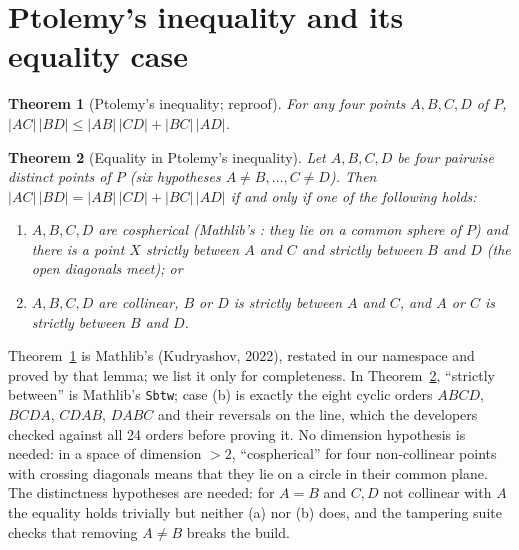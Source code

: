 \documentclass[11pt]{article}
\newtheorem{theorem}{Theorem}
\theoremstyle{definition}
\theoremstyle{remark}
\newcommand{\lean}[1]{\texttt{#1}}
\begin{document}
\section{Ptolemy's inequality and its equality case}\label{sec:ptolemy}
\begin{theorem}[Ptolemy's inequality; reproof]\label{thm:ptolemy}
For any four points $A,B,C,D$ of $P$, $|AC|\,|BD|\le|AB|\,|CD|+|BC|\,|AD|$.
\end{theorem}
\begin{theorem}[Equality in Ptolemy's inequality]\label{thm:ptolemyeq}
Let $A,B,C,D$ be four pairwise distinct points of $P$ (six hypotheses $A\ne B,\dots,C\ne D$).
Then $|AC|\,|BD|=|AB|\,|CD|+|BC|\,|AD|$ if and only if one of the following holds:
\begin{enumerate}
\item[(a)] $A,B,C,D$ are cospherical (Mathlib's : they lie on
a common sphere of $P$) and there is a point $X$ strictly between $A$ and $C$ and strictly between
$B$ and $D$ (the open diagonals meet); or
\item[(b)] $A,B,C,D$ are collinear, $B$ or $D$ is strictly between $A$ and $C$, and $A$ or $C$ is
strictly between $B$ and $D$.
\end{enumerate}
\end{theorem}
Theorem~\ref{thm:ptolemy} is Mathlib's 
(Kudryashov, 2022), restated in our namespace and proved by that lemma; we list it only for
completeness. In Theorem~\ref{thm:ptolemyeq}, ``strictly between'' is Mathlib's \lean{Sbtw}; case (b)
is exactly the eight cyclic orders $ABCD$, $BCDA$, $CDAB$, $DABC$ and their reversals on the line,
which the developers checked against all 24 orders before proving it. No dimension hypothesis is
needed: in a space of dimension $>2$, ``cospherical'' for four non-collinear points with crossing
diagonals means that they lie on a circle in their common plane. The distinctness hypotheses are
needed: for $A=B$ and $C,D$ not collinear with $A$ the equality holds trivially but neither (a) nor (b)
does, and the tampering suite checks that removing $A\ne B$ breaks the build.
\end{document}
